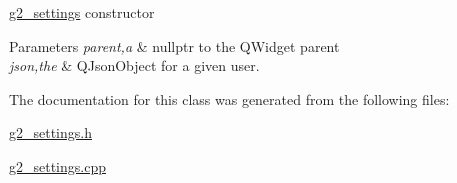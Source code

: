 \hyperlink{classg2__settings}{g2\+\_\+settings} constructor 


\begin{DoxyParams}{Parameters}
{\em parent,a} & nullptr to the Q\+Widget parent \\
\hline
{\em json,the} & Q\+Json\+Object for a given user. \\
\hline
\end{DoxyParams}


The documentation for this class was generated from the following files\+:\begin{DoxyCompactItemize}
\item 
\hyperlink{g2__settings_8h}{g2\+\_\+settings.\+h}\item 
\hyperlink{g2__settings_8cpp}{g2\+\_\+settings.\+cpp}\end{DoxyCompactItemize}

